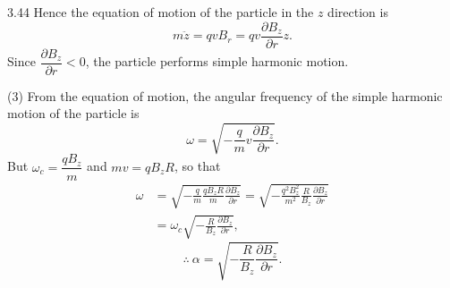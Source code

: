 \begin{solution}{3.44}
Hence the equation of motion of the particle in the $z$ direction is
\[
m\ddot{z}=qvB_r=qv\frac{\partial B_z}{\partial r}z.
\]
Since $\dfrac{\partial B_z}{\partial r}<0$, the particle performs simple harmonic motion.

(3) From the equation of motion, the angular frequency of the simple harmonic motion of the particle is
\[
\omega=\sqrt{-\frac{q}{m}v\frac{\partial B_z}{\partial r}}.
\]
But $\omega_c=\dfrac{qB_z}{m}$ and $mv=qB_zR$, so that
\begin{align*}
\omega &= \sqrt{-\frac{q}{m}\frac{qB_zR}{m}\frac{\partial B_z}{\partial r}}=\sqrt{-\frac{q^2B_z^2}{m^2}\frac{R}{B_z}\frac{\partial B_z}{\partial r}}\\
&= \omega_c\sqrt{-\frac{R}{B_z}\frac{\partial B_z}{\partial r}},
\end{align*}
\[
\therefore\ \alpha=\sqrt{-\frac{R}{B_z}\frac{\partial B_z}{\partial r}}.
\]
\end{solution}

